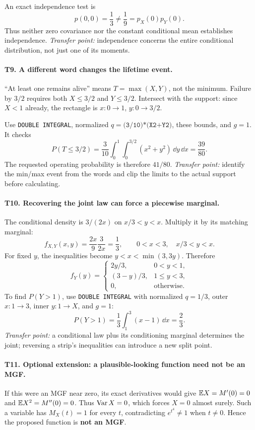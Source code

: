 An exact independence test is
\[
p(0,0)=\frac13\ne\frac19=p_X(0)p_Y(0).
\]
Thus neither zero covariance nor the constant conditional mean establishes independence. \emph{Transfer point:} independence concerns the entire conditional distribution, not just one of its moments.

\paragraph{T9. A different word changes the lifetime event.}
``At least one remains alive'' means $T=\max(X,Y)$, not the minimum. Failure by $3/2$ requires both $X\le3/2$ and $Y\le3/2$. Intersect with the support: since $X<1$ already, the rectangle is $x:0\to1$, $y:0\to3/2$.

Use \texttt{DOUBLE INTEGRAL}, normalized $q=\texttt{(3/10)*(X\^{}2+Y\^{}2)}$, these bounds, and $g=1$. It checks
\[
P(T\le3/2)=\frac3{10}\int_0^1\int_0^{3/2}(x^2+y^2)\,\dd y\,\dd x=\frac{39}{80}.
\]
The requested operating probability is therefore $\boxed{41/80}$. \emph{Transfer point:} identify the min/max event from the words and clip the limits to the actual support before calculating.

\paragraph{T10. Recovering the joint law can force a piecewise marginal.}
The conditional density is $3/(2x)$ on $x/3<y<x$. Multiply it by its matching marginal:
\[
f_{X,Y}(x,y)=\frac{2x}{9}\frac3{2x}=\boxed{\frac13},
\qquad0<x<3,\quad x/3<y<x.
\]
For fixed $y$, the inequalities become $y<x<\min(3,3y)$. Therefore
\[
f_Y(y)=\begin{cases}
2y/3,&0<y<1,\\
(3-y)/3,&1\le y<3,\\
0,&\text{otherwise}.
\end{cases}
\]
To find $P(Y>1)$, use \texttt{DOUBLE INTEGRAL} with normalized $q=1/3$, outer $x:1\to3$, inner $y:1\to X$, and $g=1$:
\[
P(Y>1)=\frac13\int_1^3(x-1)\,\dd x=\boxed{\frac23}.
\]
\emph{Transfer point:} a conditional law plus its conditioning marginal determines the joint; reversing a strip's inequalities can introduce a new split point.

\paragraph{T11. Optional extension: a plausible-looking function need not be an MGF.}
If this were an MGF near zero, its exact derivatives would give $\mathbb E X=M'(0)=0$ and $\mathbb E X^2=M''(0)=0$. Thus $\operatorname{Var} X=0$, which forces $X=0$ almost surely. Such a variable has $M_X(t)=1$ for every $t$, contradicting $e^{t^4}\ne1$ when $t\ne0$. Hence the proposed function is \textbf{not an MGF}.

